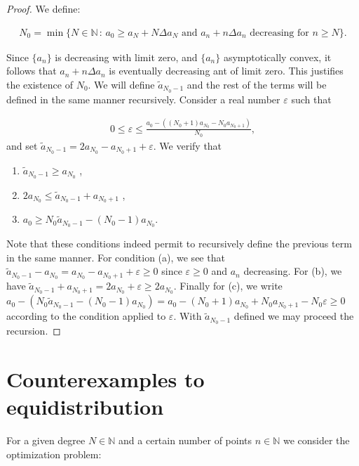 \documentclass{amsart}[11pt]
\newcommand{\N}{\mathbb{N}} %
\newcommand{\eps}{\varepsilon}
\theoremstyle{definition}
\begin{document}
\begin{proof}

We define:

\begin{gather*}
N_0 = \min\{ N \in \N \, : \, a_0 \geq a_N + N\Delta a_N \,\,\text{and}\,\, a_n + n \Delta a_n \,\, \text{decreasing for} \,\, n \geq N \}. 
\end{gather*}

Since $\{a_n\}$ is decreasing with limit zero, and $\{a_n\}$ asymptotically convex, it follows that $a_n + n \Delta a_n$ is eventually decreasing ant of limit zero. This justifies the existence of $N_0$. We will define $\tilde{a}_{N_0-1}$ and the rest of the terms will be defined in the same manner recursively. Consider a real number $\eps$ such that

    \begin{gather*}
 0 \leq \eps \leq \frac{a_0 - ((N_0+1)a_{N_0} - N_0a_{N_0+1})}{N_0},
    \end{gather*}
and set $\tilde{a}_{N_0-1} = 2a_{N_0} - a_{N_0+1}+ \eps$. We verify that 

\begin{enumerate}[label=(\alph*)]
\item  $\tilde{a}_{N_0-1} \geq a_{N_0}$ ,
\item $2a_{N_0} \leq \tilde{a}_{N_0-1} + a_{N_0 +1}$ ,
\item $a_0 \geq N_0 \tilde{a}_{N_0-1} - (N_0-1)a_{N_0}$.
\end{enumerate}

Note that these conditions indeed permit to recursively define the previous term in the same manner. For condition (a), we see that $\tilde{a}_{N_0-1} - a_{N_0} = a_{N_0} - a_{N_0+1} + \eps \geq 0$ since $\eps \geq 0 $ and $a_n$ decreasing. For (b), we have $\tilde{a}_{N_0-1} + a_{N_0 +1} = 2a_{N_0 }+ \eps \geq 2a_{N_0}$. Finally for (c), we write $a_0 - ( N_0 \tilde{a}_{N_0-1} - (N_0-1)a_{N_0})  =a_0 - (N_0 + 1)a_{N_0} + N_0 a_{N_0 +1} - N_0 \eps \geq 0$ according to the condition applied to $\eps$. With $\tilde{a}_{N_0-1}$ defined we may proceed the recursion.
\end{proof}



\section{Counterexamples to equidistribution}

For a given degree $N \in \N$ and a certain number of points $n \in \N$ we consider the optimization problem:
\end{document}
